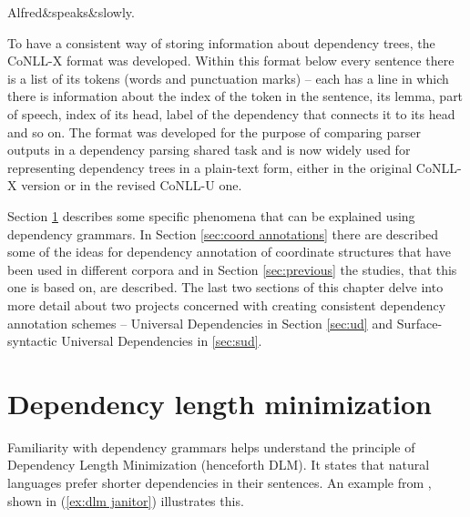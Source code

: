 \begin{exe}
    \ex
    \label{ex:tesniere today}
    \begin{dependency}[theme = simple]
    \begin{deptext}
        Alfred\&speaks\&slowly.\\
    \end{deptext}
    \end{dependency}
\end{exe}

To have a consistent way of storing information about dependency trees, the CoNLL-X format \citep{buchholz-marsi-2006-conll} was developed. Within this format below every sentence there is a list of its tokens (words and punctuation marks) -- each has a line in which there is information about the index of the token in the sentence, its lemma, part of speech, index of its head, label of the dependency that connects it to its head and so on. The format was developed for the purpose of comparing parser outputs in a dependency parsing shared task and is now widely used for representing dependency trees in a plain-text form, either in the original CoNLL-X version or in the revised CoNLL-U one. 

Section \ref{sec:dlm} describes some specific phenomena that can be explained using dependency grammars. In Section \ref{sec:coord annotations} there are described some of the ideas for dependency annotation of coordinate structures that have been used in different corpora and in Section \ref{sec:previous} the studies, that this one is based on, are described. The last two sections of this chapter delve into more detail about two projects concerned with creating consistent dependency annotation schemes -- Universal Dependencies in Section \ref{sec:ud} and Surface-syntactic Universal Dependencies in \ref{sec:sud}. 

\section{Dependency length minimization}\label{sec:dlm}
Familiarity with dependency grammars helps understand the principle of Dependency Length Minimization (henceforth DLM). It states that natural languages prefer shorter dependencies in their sentences. An example from \cite{hp83}, shown in (\ref{ex:dlm janitor}) illustrates this.

